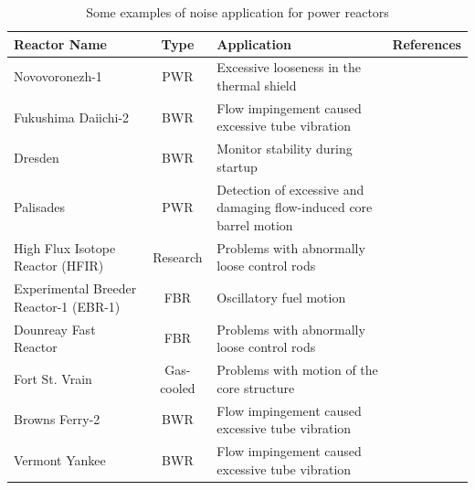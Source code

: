 \begin{table}[ht]
        \centering
        \caption{Some examples of noise application for power reactors}
        {\renewcommand{\arraystretch}{2}%
        \begin{tabular}{ | m{3.5cm} |c| m{7cm} |c| } 
         \hline
         \textbf{Reactor Name} & \textbf{Type} & \textbf{Application}& \textbf{References} \\ 
         \hline
         Novovoronezh-1 & PWR &  Excessive looseness in the thermal shield & \cite{thiePowerReactorNoise1981} \\ 
         \hline
         Fukushima Daiichi-2 & BWR & Flow impingement caused excessive tube vibration & \cite{behringerObservationIncoreInstrument1977, mathisCharacterizationStudiesBWR41977}\\ 
         \hline
         Dresden & BWR & Monitor stability during startup & \cite{thieElementaryMethodsReactor1963} \\ 
         \hline
         Palisades & PWR & Detection of excessive and damaging flow-induced core barrel motion & \cite{fryAnalysisNeutrondensityOscillations1975} \\ 
         \hline
         High Flux Isotope Reactor (HFIR) & Research & Problems with abnormally loose control rods & \cite{behringerObservationIncoreInstrument1977, mathisCharacterizationStudiesBWR41977}\\ 
         \hline
         Experimental Breeder Reactor-1 (EBR-1) & FBR & Oscillatory fuel motion & \cite{thiePowerReactorNoise1981} \\ 
         \hline
         Dounreay Fast Reactor & FBR & Problems with abnormally loose control rods & \cite{barclayDevelopmentNoiseAnalysis1977} \\ 
         \hline
         Fort St. Vrain & Gas-cooled & Problems with motion of the core structure & \cite{thiePowerReactorNoise1981} \\ 
         \hline
         Browns Ferry-2 & BWR & Flow impingement caused excessive tube vibration & \cite{behringerObservationIncoreInstrument1977, mathisCharacterizationStudiesBWR41977} \\ 
         \hline
         Vermont Yankee & BWR & Flow impingement caused excessive tube vibration & \cite{behringerObservationIncoreInstrument1977, mathisCharacterizationStudiesBWR41977} \\ 
         \hline
        \end{tabular}} \quad
        \label{table:diagnostics}
\end{table}

